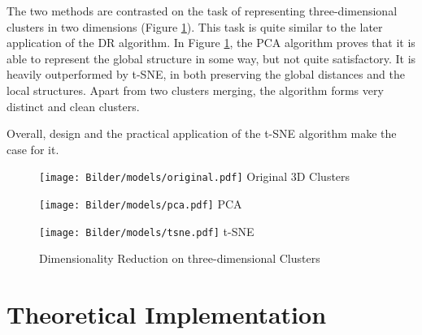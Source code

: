 The two methods are contrasted on the task of representing three-dimensional clusters in two dimensions (Figure \ref{fig:DR}). This task is quite similar to the later application of the \ac{DR} algorithm. In Figure \ref{fig:DR}, the \ac{PCA} algorithm proves that it is able to represent the global structure in some way, but not quite satisfactory. It is heavily outperformed by \ac{t-SNE}, in both preserving the global distances and the local structures. Apart from two clusters merging, the algorithm forms very distinct and clean clusters.

Overall, design and the practical application of the \ac{t-SNE} algorithm make the case for it.




\begin{figure} 
	\begin{minipage}{0.3\textwidth}
		
		\texttt{[image: Bilder/models/original.pdf]}
			\label{fig:original}
		\captionsetup{labelformat=empty}
		\centering
		Original 3D Clusters
	
	\end{minipage}
	\hfill
	\begin{minipage}{0.3\textwidth}
		
		\texttt{[image: Bilder/models/pca.pdf]}
		\label{fig:pca}
		\captionsetup{labelformat=empty}
		\centering
		\ac{PCA}
	\end{minipage}
	\hfill
	\begin{minipage}{0.3\textwidth}
		
		\texttt{[image: Bilder/models/tsne.pdf]}
		\label{fig:tsne}
		\captionsetup{labelformat=empty}
		\centering
		\ac{t-SNE}
	\end{minipage}
	
\caption{Dimensionality Reduction on three-dimensional Clusters}
\label{fig:DR}
\end{figure} 

\section{Theoretical Implementation}

